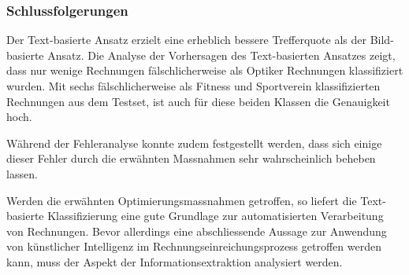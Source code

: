 \subsubsection{Schlussfolgerungen}

Der Text-basierte Ansatz erzielt eine erheblich bessere Trefferquote als der Bild-basierte Ansatz. Die Analyse der Vorhersagen des Text-basierten Ansatzes zeigt, dass nur wenige Rechnungen fälschlicherweise als Optiker Rechnungen klassifiziert wurden. Mit sechs fälschlicherweise als Fitness und Sportverein klassifizierten Rechnungen aus dem Testset, ist auch für diese beiden Klassen die Genauigkeit hoch. 


Während der Fehleranalyse konnte zudem festgestellt werden, dass sich einige dieser Fehler durch die erwähnten Massnahmen sehr wahrscheinlich beheben lassen.

Werden die erwähnten Optimierungsmassnahmen getroffen, so liefert die Text-basierte Klassifizierung eine gute Grundlage zur automatisierten Verarbeitung von Rechnungen. Bevor allerdings eine abschliessende Aussage zur Anwendung von künstlicher Intelligenz im Rechnungseinreichungsprozess getroffen werden kann, muss der Aspekt der Informationsextraktion analysiert werden.
